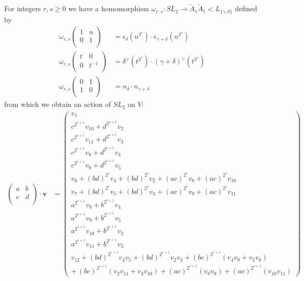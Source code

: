 For integers $r,s\geq 0$ we have a homomorphism $\omega_{r,s}:SL_2\rightarrow \widetilde{A}_1\widetilde{A}_1 < L_{\{\gamma,\delta\}}$ defined by
\begin{align*}
\omega_{r,s}   \left(\begin{matrix} %
      1 & u \\
      0 & 1 \\
   \end{matrix}\right) &= \epsilon_\delta(u^{2^r})\cdot\epsilon_{\gamma+\delta}(u^{2^s}) \\
\omega_{r,s}   \left(\begin{matrix} %
      t & 0 \\
      0 & t^{-1} \\
   \end{matrix}\right) &= \delta^\vee(t^{2^r})\cdot(\gamma+\delta)^\vee(t^{2^s}) \\
\omega_{r,s}   \left(\begin{matrix} %
      0 & 1 \\
      1 & 0 \\
   \end{matrix}\right) &= n_\delta\cdot n_{\gamma+\delta} 
\end{align*}
from which we obtain an action of $SL_2$ on $V$:
\begin{align*}
\left( \begin{matrix}
	      a & b \\
	      c & d \\
	   \end{matrix}\right) \cdot \mathbf{v} &=
	   \left( \begin{matrix}
	   v_1 \\
	   c^{2^{s+1}} v_{10} + d^{2^{s+1}}v_2 \\
	   c^{2^{s+1}} v_{11} + d^{2^{s+1}}v_3 \\
	   c^{2^{r+1}} v_{8} + d^{2^{r+1}}v_4 \\
	   c^{2^{r+1}} v_{9} + d^{2^{r+1}}v_5 \\
	   v_6 + (bd)^{2^r}v_4 + (bd)^{2^s}v_2 + (ac)^{2^r}v_8 + (ac)^{2^s}v_{10} \\
	   v_7 + (bd)^{2^r}v_5 + (bd)^{2^s}v_3 + (ac)^{2^r}v_9 + (ac)^{2^s}v_{11} \\
	   a^{2^{r+1}}v_8 + b^{2^{r+1}}v_4 \\
	   a^{2^{r+1}}v_9 + b^{2^{r+1}}v_5 \\
	   a^{2^{s+1}}v_{10} + b^{2^{s+1}}v_2 \\
	   a^{2^{s+1}}v_{11} + b^{2^{s+1}}v_3 \\
	   v_{12} + (bd)^{2^{r+1}}v_4v_5 + (bd)^{2^{s+1}}v_2v_3 + (bc)^{2^{r+1}}(v_4v_9 + v_5v_8)\\ +\, (bc)^{2^{s+1}}(v_2v_{11} + v_3v_{10}) + (ac)^{2^{r+1}}(v_8v_9) + (ac)^{2^{s+1}}(v_{10}v_{11})
	   \end{matrix} \right)
\end{align*}

